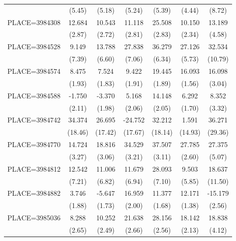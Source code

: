 {\begin{tabular}{l*{6}{c}}
                    &      (5.45)&      (5.18)&      (5.24)&      (5.39)&      (4.44)&      (8.72)\\
PLACE=3984308       &      12.684&      10.543&      11.118&      25.508&      10.150&      13.189\\
                    &      (2.87)&      (2.72)&      (2.81)&      (2.83)&      (2.34)&      (4.58)\\
PLACE=3984528       &       9.149&      13.788&      27.838&      36.279&      27.126&      32.534\\
                    &      (7.39)&      (6.60)&      (7.06)&      (6.34)&      (5.73)&     (10.79)\\
PLACE=3984574       &       8.475&       7.524&       9.422&      19.445&      16.093&      16.098\\
                    &      (1.93)&      (1.83)&      (1.91)&      (1.89)&      (1.56)&      (3.04)\\
PLACE=3984588       &      -1.750&      -3.370&       5.168&      14.148&       6.292&       8.352\\
                    &      (2.11)&      (1.98)&      (2.06)&      (2.05)&      (1.70)&      (3.32)\\
PLACE=3984742       &      34.374&      26.695&     -24.752&      32.212&       1.591&      36.271\\
                    &     (18.46)&     (17.42)&     (17.67)&     (18.14)&     (14.93)&     (29.36)\\
PLACE=3984770       &      14.724&      18.816&      34.529&      37.507&      27.785&      27.375\\
                    &      (3.27)&      (3.06)&      (3.21)&      (3.11)&      (2.60)&      (5.07)\\
PLACE=3984812       &      12.542&      11.006&      11.679&      28.093&       9.503&      18.637\\
                    &      (7.21)&      (6.82)&      (6.94)&      (7.10)&      (5.85)&     (11.50)\\
PLACE=3984882       &       3.746&      -5.647&      16.959&      11.377&      12.171&     -15.179\\
                    &      (1.88)&      (1.73)&      (2.00)&      (1.68)&      (1.38)&      (2.56)\\
PLACE=3985036       &       8.288&      10.252&      21.638&      28.156&      18.142&      18.838\\
                    &      (2.65)&      (2.49)&      (2.66)&      (2.56)&      (2.13)&      (4.12)\\

\end{tabular}}
